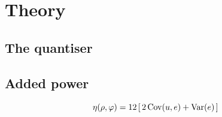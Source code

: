 \section{Theory}
\label{sec:theory}

%
%

\subsection{The quantiser}

\subsection{Added power}
\begin{equation}
  \eta(\rho,\varphi) = 12\left[\,2\,\mathrm{Cov}(u,e) + \mathrm{Var}(e)\,\right]
  \label{eq:eta}
\end{equation}




